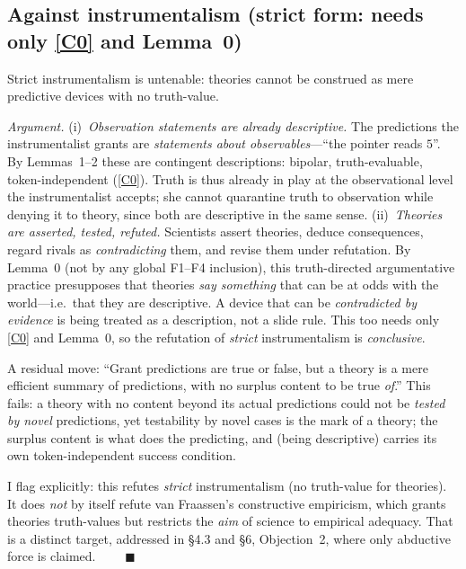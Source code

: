 \documentclass[12pt]{article}
\begin{document}
\subsection{Against instrumentalism (strict form: needs only \ref{C0} and Lemma~0)}

\begin{description}[leftmargin=1.6em,style=nextline]
\item[Claim 5.] Strict instrumentalism is untenable: theories cannot be
construed as mere predictive devices with no truth-value.
\end{description}

\noindent\emph{Argument.} (i)~\emph{Observation statements are already
descriptive.} The predictions the instrumentalist grants are
\emph{statements about observables}---``the pointer reads $5$''. By
Lemmas~1--2 these are contingent descriptions: bipolar, truth-evaluable,
token-independent (\ref{C0}). Truth is thus already in play at the
observational level the instrumentalist accepts; she cannot quarantine
truth to observation while denying it to theory, since both are
descriptive in the same sense. (ii)~\emph{Theories are asserted, tested,
refuted.} Scientists assert theories, deduce consequences, regard rivals
as \emph{contradicting} them, and revise them under refutation. By
Lemma~0 (not by any global F1--F4 inclusion), this truth-directed
argumentative practice presupposes that theories \emph{say something} that
can be at odds with the world---i.e.\ that they are descriptive. A device
that can be \emph{contradicted by evidence} is being treated as a
description, not a slide rule. This too needs only \ref{C0} and Lemma~0,
so the refutation of \emph{strict} instrumentalism is \emph{conclusive}.

A residual move: ``Grant predictions are true or false, but a theory is a
mere efficient summary of predictions, with no surplus content to be true
\emph{of}.'' This fails: a theory with no content beyond its actual
predictions could not be \emph{tested by novel} predictions, yet
testability by novel cases is the mark of a theory; the surplus content is
what does the predicting, and (being descriptive) carries its own
token-independent success condition.

I flag explicitly: this refutes \emph{strict} instrumentalism (no
truth-value for theories). It does \emph{not} by itself refute van
Fraassen's constructive empiricism, which grants theories truth-values but
restricts the \emph{aim} of science to empirical adequacy. That is a
distinct target, addressed in \S4.3 and \S6, Objection~2, where only
abductive force is claimed.
$\qquad\blacksquare$
\end{document}
